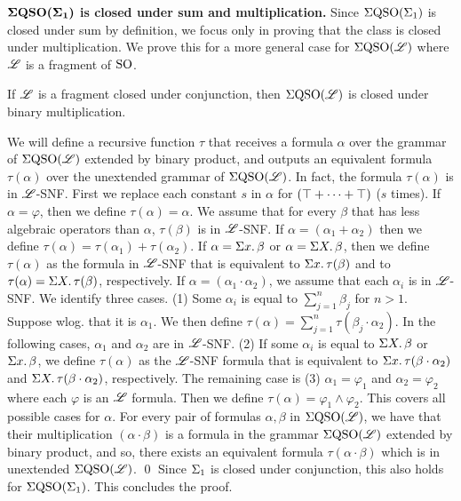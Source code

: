 \vspace{1em}
$\boldsymbol{\Sigma{\rm QSO}(\Sigma_{1})}$ {\bf is closed under sum and multiplication.} Since $\Sigma{\rm QSO}(\Sigma_{1})$ is closed under sum by definition, we focus only in proving that the class is closed under multiplication. We prove this for a more general case for $\Sigma{\rm QSO}(\mathscr{L})$ where $\mathscr{L}$ is a fragment of ${\rm SO}$.

\begin{lem} \label{conj-mult}
	If $\mathscr{L}$ is a fragment closed under conjunction, then $\Sigma{\rm QSO}(\mathscr{L})$ is closed under binary multiplication.
\end{lem}
\proof
	We will define a recursive function $\tau$ that receives a formula $\alpha$ over the grammar of $\Sigma{\rm QSO}(\mathscr{L})$ extended by binary product, and outputs an equivalent formula $\tau(\alpha)$ over the unextended grammar of $\Sigma{\rm QSO}(\mathscr{L})$. In fact, the formula $\tau(\alpha)$ is in $\mathscr{L}$-SNF. First we replace each constant $s$ in $\alpha$ for $(\top + \cdots + \top)$ ($s$ times). If $\alpha = \varphi$, then we define $\tau(\alpha) = \alpha$. We assume that for every $\beta$ that has less algebraic operators than $\alpha$, $\tau(\beta)$ is in $\mathscr{L}$-SNF. If $\alpha = (\alpha_1 + \alpha_2)$ then we define $\tau(\alpha) = \tau(\alpha_1) + \tau(\alpha_2)$. If $\alpha = \Sigma{x}.\,\beta$ or $\alpha = \Sigma{X}.\,\beta$, then we define $\tau(\alpha)$ as the formula in $\mathscr{L}$-SNF that is equivalent to $\Sigma{x}.\,\tau(\beta)$ and to $\tau(\alpha) = \Sigma{X}.\,\tau(\beta)$, respectively. If $\alpha = (\alpha_1 \cdot \alpha_2)$, we assume that each $\alpha_i$ is in $\mathscr{L}$-SNF. We identify three cases. (1) Some $\alpha_i$ is equal to $\sum_{j = 1}^n\beta_j$ for $n > 1$. Suppose wlog. that it is $\alpha_1$. We then define $\tau(\alpha) = \sum_{j = 1}^n\tau(\beta_j\cdot\alpha_2)$. In the following cases, $\alpha_1$ and $\alpha_2$ are in $\mathscr{L}$-SNF. (2) If some $\alpha_i$ is equal to $\Sigma{X}.\,\beta$ or $\Sigma{x}.\,\beta$, we define $\tau(\alpha)$ as the $\mathscr{L}$-SNF formula that is equivalent to $\Sigma{x}.\,\tau(\beta\cdot\alpha_2)$ and $\Sigma{X}.\,\tau(\beta\cdot\alpha_2)$, respectively. The remaining case is (3) $\alpha_1 = \varphi_1$ and $\alpha_2 = \varphi_2$ where each $\varphi$ is an $\mathscr{L}$ formula. Then we define $\tau(\alpha) = \varphi_1 \wedge \varphi_2$. This covers all possible cases for $\alpha$. For every pair of formulas $\alpha,\beta$ in $\Sigma{\rm QSO}(\mathscr{L})$, we have that their multiplication $(\alpha\cdot\beta)$ is a formula in the grammar $\Sigma{\rm QSO}(\mathscr{L})$ extended by binary product, and so, there exists an equivalent formula $\tau(\alpha\cdot\beta)$ which is in unextended $\Sigma{\rm QSO}(\mathscr{L})$.
\qed
Since $\Sigma_{1}$ is closed under conjunction, this also holds for $\Sigma{\rm QSO}(\Sigma_{1})$. This concludes the proof.